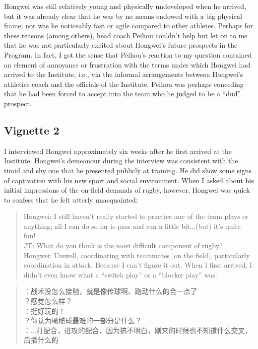 Hongwei was still relatively young and physically undeveloped when he arrived, but it was already clear that he was by no means endowed with a big physical frame; nor was he noticeably fast or agile compared to other athletes.  Perhaps for these reasons (among others), head coach Peihou couldn’t help but let on to me that he was not particularly excited about Hongwei's future prospects in the Program.  In fact, I got the sense that Peihou's reaction to my question contained an element of annoyance or frustration with the terms under which Hongwei had arrived to the Institute, i.e., via the informal arrangements between Hongwei’s athletics coach and the officials of the Institute.    Peihou was perhaps conceding that he had been forced to accept into the team who he judged to be a ``dud'' prospect.

\subsection{Vignette 2}
I interviewed Hongwei approximately six weeks after he first arrived at the Institute.   Hongwei's demeanour during the interview was consistent with the timid and shy one that he presented publicly at training. He did show some signs of captivation with his new sport and social environment.  When I asked about his initial impressions of the on-field demands of rugby, however, Hongwei was quick to confess that he felt utterly unacquainted:

\begin{quotation}
  Hongwei: I still haven’t really started to practice any of the team plays or anything; all I can do so far is pass and run a little bit...(but) it's quite fun! \\
  JT: What do you think is the most difficult component of rugby? \\
  Hongwei: Um\textellipsis well, coordinating with teammates [on the field], particularly coordination in attack.  Because I can't figure it out. When I first arrived, I didn’t even know what a ``switch play'' or a ``blocker play'' was.
\end{quotation}

\begin{CJK}{UTF8}{gbsn}
  \begin{quotation}
    ：战术没怎么接触，就是像传球啊、跑动什么的会一点了 \\
    ？感觉怎么样？\\
    ：挺好玩的！\\
    ？你认为橄榄球最难的一部分是什么？ \\
    ：...打配合，进攻的配合，因为搞不明白，刚来的时候也不知道什么交叉，后插什么的 \\
  \end{quotation}
\end{CJK}

